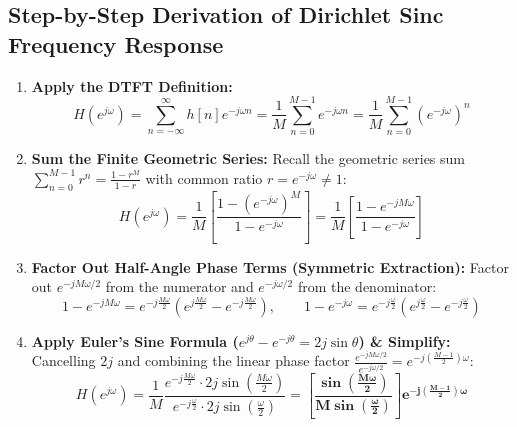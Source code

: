 \documentclass[11pt,a4paper]{article}
\begin{document}
\subsection{Step-by-Step Derivation of Dirichlet Sinc Frequency Response}
\begin{enumerate}
    \item \textbf{Apply the DTFT Definition:}
    \begin{equation}
    H(e^{j\omega}) = \sum_{n=-\infty}^{\infty} h[n] e^{-j\omega n} = \frac{1}{M} \sum_{n=0}^{M-1} e^{-j\omega n} = \frac{1}{M} \sum_{n=0}^{M-1} \left(e^{-j\omega}\right)^n
    \end{equation}

    \item \textbf{Sum the Finite Geometric Series:}
    Recall the geometric series sum $\sum_{n=0}^{M-1} r^n = \frac{1 - r^M}{1 - r}$ with common ratio $r = e^{-j\omega} \ne 1$:
    \begin{equation}
    H(e^{j\omega}) = \frac{1}{M} \left[ \frac{1 - \left(e^{-j\omega}\right)^M}{1 - e^{-j\omega}} \right] = \frac{1}{M} \left[ \frac{1 - e^{-j M \omega}}{1 - e^{-j\omega}} \right]
    \end{equation}

    \item \textbf{Factor Out Half-Angle Phase Terms (Symmetric Extraction):}
    Factor out $e^{-j M\omega / 2}$ from the numerator and $e^{-j\omega / 2}$ from the denominator:
    \begin{equation}
    1 - e^{-j M \omega} = e^{-j \frac{M\omega}{2}} \left( e^{j \frac{M\omega}{2}} - e^{-j \frac{M\omega}{2}} \right), \qquad 1 - e^{-j\omega} = e^{-j \frac{\omega}{2}} \left( e^{j \frac{\omega}{2}} - e^{-j \frac{\omega}{2}} \right)
    \end{equation}

    \item \textbf{Apply Euler's Sine Formula ($e^{j\theta} - e^{-j\theta} = 2j\sin\theta$) \& Simplify:}
    Cancelling $2j$ and combining the linear phase factor $\frac{e^{-j M\omega/2}}{e^{-j\omega/2}} = e^{-j \left(\frac{M-1}{2}\right)\omega}$:
    \begin{equation}
    H(e^{j\omega}) = \frac{1}{M} \frac{e^{-j \frac{M\omega}{2}} \cdot 2j \sin\left(\frac{M\omega}{2}\right)}{e^{-j \frac{\omega}{2}} \cdot 2j \sin\left(\frac{\omega}{2}\right)} = \mathbf{\left[ \frac{\sin\left(\frac{M\omega}{2}\right)}{M\sin\left(\frac{\omega}{2}\right)} \right] e^{-j \left(\frac{M-1}{2}\right)\omega}}
    \end{equation}
\end{enumerate}
\end{document}
